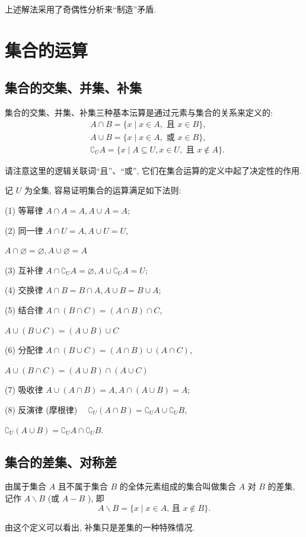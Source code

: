 \begin{note}
	上述解法采用了奇偶性分析来“制造”矛盾.
\end{note}

\section{集合的运算}

\subsection{集合的交集、并集、补集}
集合的交集、并集、补集三种基本沄算是通过元素与集合的关系来定义的:
$$
	\begin{aligned}
		 & A \cap B=\{x \mid x \in A, \text { 且 } x \in B\},                             \\
		 & A \cup B=\{x \mid x \in A, \text { 或 } x \in B\},                             \\
		 & \complement_{U} A=\{x \mid A \subseteq U, x \in U, \text { 且 } x \notin A\} .
	\end{aligned}
$$

请注意这里的逻辑关联词“且”、“或”, 它们在集合运算的定义中起了决定性的作用.

记 $U$ 为全集, 容易证明集合的运算满足如下法则:

(1) 等幂律 $A \cap A=A, A \cup A=A$;

(2) 同一律 $A \cap U=A, A \cup U=U$,

$A \cap \varnothing=\varnothing, A \cup \varnothing=A$

(3) 互补律 $A \cap \complement_{U} A=\varnothing, A \cup \complement_{U} A=U$;

(4) 交换律 $A \cap B=B \cap A, A \cup B=B \cup A$;

(5) 结合律 $A \cap(B \cap C)=(A \cap B) \cap C$,

$A \cup(B \cup C)=(A \cup B) \cup C$

(6) 分配律 $A \cap(B \cup C)=(A \cap B) \cup(A \cap C)$,

$A \cup(B \cap C)=(A \cup B) \cap(A \cup C)$

(7) 吸收律 $A \cup(A \cap B)=A, A \cap(A \cup B)=A$;

(8) 反演律 (摩根律) $\quad \complement_{U}(A \cap B)=\complement_{U} A \cup \complement_{U} B$,

$\complement_{U}(A \cup B)=\complement_{U} A \cap \complement_{U} B$.

\subsection{集合的差集、对称差}
\begin{definition}
	由属于集合 $A$ 且不属于集合 $B$ 的全体元素组成的集合叫做集合 $A$ 对 $B$ 的差集, 记作 $A \backslash B$ (或 $A-B$ ), 即
	$$
		A \backslash B=\{x \mid x \in A \text {, 且 } x \notin B\} .
	$$
\end{definition}
由这个定义可以看出, 补集只是差集的一种特殊情况.

